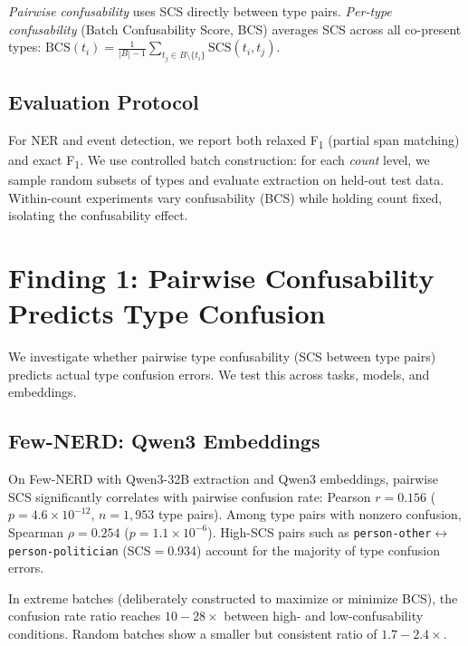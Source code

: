 \documentclass[11pt,a4paper]{article}
\begin{document}
\emph{Pairwise confusability} uses SCS directly between type pairs.
\emph{Per-type confusability} (Batch Confusability Score, BCS) averages SCS across all co-present types:
$\text{BCS}(t_i) = \frac{1}{|B|-1}\sum_{t_j \in B \setminus \{t_i\}} \text{SCS}(t_i, t_j)$.

\subsection{Evaluation Protocol}

For NER and event detection, we report both relaxed F\textsubscript{1} (partial span matching) and exact F\textsubscript{1}.
We use controlled batch construction: for each \emph{count} level, we sample random subsets of types and evaluate extraction on held-out test data.
Within-count experiments vary confusability (BCS) while holding count fixed, isolating the confusability effect.


\section{Finding 1: Pairwise Confusability Predicts Type Confusion}
\label{sec:finding1}

We investigate whether pairwise type confusability (SCS between type pairs) predicts actual type confusion errors.
We test this across tasks, models, and embeddings.

\subsection{Few-NERD: Qwen3 Embeddings}
\label{sec:fewnerd_pairwise}

On Few-NERD with Qwen3-32B extraction and Qwen3 embeddings, pairwise SCS significantly correlates with pairwise confusion rate: Pearson $r{=}0.156$ ($p{=}4.6{\times}10^{-12}$, $n{=}1{,}953$ type pairs).
Among type pairs with nonzero confusion, Spearman $\rho{=}0.254$ ($p{=}1.1{\times}10^{-6}$).
High-SCS pairs such as \texttt{person-other}$\leftrightarrow$\texttt{person-politician} (SCS$=$0.934) account for the majority of type confusion errors.

In extreme batches (deliberately constructed to maximize or minimize BCS), the confusion rate ratio reaches $10{-}28{\times}$ between high- and low-confusability conditions.
Random batches show a smaller but consistent ratio of $1.7{-}2.4{\times}$.
\end{document}
